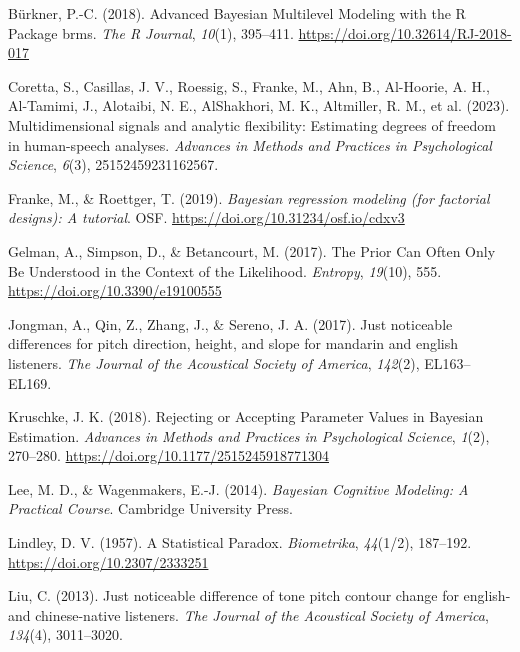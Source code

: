 \documentclass[
  doc,
  floatsintext,
  longtable,
  nolmodern,
  notxfonts,
  notimes,
  colorlinks=true,linkcolor=blue,citecolor=blue,urlcolor=blue]{apa7}
\newlength{\cslhangindent}
\newenvironment{CSLReferences}[2] %
 {\begin{list}{}{%
  \setlength{\itemindent}{0pt}
  \setlength{\leftmargin}{0pt}
  \setlength{\parsep}{0pt}
  \ifodd #1
   \setlength{\leftmargin}{\cslhangindent}
   \setlength{\itemindent}{-1\cslhangindent}
  \fi
  \setlength{\itemsep}{#2\baselineskip}}}
 {\end{list}}
\begin{document}
\label{refs}
\begin{CSLReferences}{1}{0}
Bürkner, P.-C. (2018). {Advanced Bayesian Multilevel Modeling with the R
Package brms}. \emph{{The R Journal}}, \emph{10}(1), 395--411.
\url{https://doi.org/10.32614/RJ-2018-017}

Coretta, S., Casillas, J. V., Roessig, S., Franke, M., Ahn, B.,
Al-Hoorie, A. H., Al-Tamimi, J., Alotaibi, N. E., AlShakhori, M. K.,
Altmiller, R. M., et al. (2023). Multidimensional signals and analytic
flexibility: Estimating degrees of freedom in human-speech analyses.
\emph{Advances in Methods and Practices in Psychological Science},
\emph{6}(3), 25152459231162567.

Franke, M., \& Roettger, T. (2019). \emph{Bayesian regression modeling
(for factorial designs): {A} tutorial}. OSF.
\url{https://doi.org/10.31234/osf.io/cdxv3}

Gelman, A., Simpson, D., \& Betancourt, M. (2017). The {Prior Can Often
Only Be Understood} in the {Context} of the {Likelihood}.
\emph{Entropy}, \emph{19}(10), 555.
\url{https://doi.org/10.3390/e19100555}

Jongman, A., Qin, Z., Zhang, J., \& Sereno, J. A. (2017). Just
noticeable differences for pitch direction, height, and slope for
mandarin and english listeners. \emph{The Journal of the Acoustical
Society of America}, \emph{142}(2), EL163--EL169.

Kruschke, J. K. (2018). Rejecting or {Accepting Parameter Values} in
{Bayesian Estimation}. \emph{Advances in Methods and Practices in
Psychological Science}, \emph{1}(2), 270--280.
\url{https://doi.org/10.1177/2515245918771304}

Lee, M. D., \& Wagenmakers, E.-J. (2014). \emph{Bayesian {Cognitive
Modeling}: {A Practical Course}}. Cambridge University Press.

Lindley, D. V. (1957). A {Statistical Paradox}. \emph{Biometrika},
\emph{44}(1/2), 187--192. \url{https://doi.org/10.2307/2333251}

Liu, C. (2013). Just noticeable difference of tone pitch contour change
for english-and chinese-native listeners. \emph{The Journal of the
Acoustical Society of America}, \emph{134}(4), 3011--3020.


\end{CSLReferences}
\end{document}
